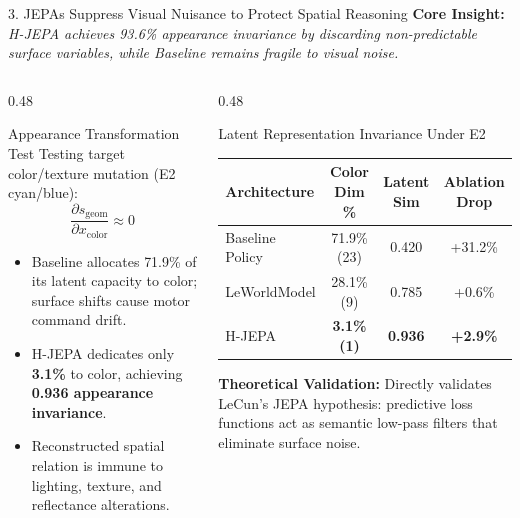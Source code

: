 \documentclass[aspectratio=169, 10pt]{beamer}
\begin{document}
\begin{frame}{3. JEPAs Suppress Visual Nuisance to Protect Spatial Reasoning}
  \textbf{Core Insight:} \textit{H-JEPA achieves 93.6\% appearance invariance by discarding non-predictable surface variables, while Baseline remains fragile to visual noise.}

  \vspace{0.2cm}
  \begin{columns}[T]
    \begin{column}{0.48\textwidth}
      \begin{block}{Appearance Transformation Test}
        \small
        Testing target color/texture mutation (E2 cyan/blue):
        \begin{equation*}
          \frac{\partial s_{\mathrm{geom}}}{\partial x_{\mathrm{color}}} \approx 0
        \end{equation*}
        \begin{itemize}
          \item Baseline allocates \alert{71.9\%} of its latent capacity to color; surface shifts cause motor command drift.
          \item H-JEPA dedicates only \textbf{3.1\%} to color, achieving \textbf{0.936 appearance invariance}.
          \item Reconstructed spatial relation is immune to lighting, texture, and reflectance alterations.
        \end{itemize}
      \end{block}
    \end{column}

    \begin{column}{0.48\textwidth}
      \begin{block}{Latent Representation Invariance Under E2}
        \scriptsize
        \centering
        \setlength{\tabcolsep}{3pt}
        \begin{tabular}{lccc}
          \toprule
          \textbf{Architecture} & \textbf{Color Dim \%} & \textbf{Latent Sim} & \textbf{Ablation Drop} \\
          \midrule
          Baseline Policy & \alert{71.9\%} (23) & 0.420 & \alert{+31.2\%} \\
          LeWorldModel & 28.1\% (9) & 0.785 & +0.6\% \\
          H-JEPA & \textbf{3.1\% (1)} & \textbf{0.936} & \textbf{+2.9\%} \\
          \bottomrule
        \end{tabular}
      \end{block}
      \vspace{0.05cm}
      \scriptsize \textbf{Theoretical Validation:} Directly validates LeCun's JEPA hypothesis: predictive loss functions act as semantic low-pass filters that eliminate surface noise.
    \end{column}
  \end{columns}
\end{frame}
\end{document}
